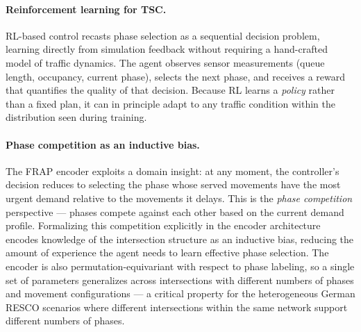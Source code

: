 \paragraph{Reinforcement learning for TSC.}
RL-based control recasts phase selection as a sequential decision problem, learning directly from simulation feedback without requiring a hand-crafted model of traffic dynamics. The agent observes sensor measurements (queue length, occupancy, current phase), selects the next phase, and receives a reward that quantifies the quality of that decision. Because RL learns a \emph{policy} rather than a fixed plan, it can in principle adapt to any traffic condition within the distribution seen during training.

\paragraph{Phase competition as an inductive bias.}
The FRAP encoder \citep{zheng2019learning} exploits a domain insight: at any moment, the controller's decision reduces to selecting the phase whose served movements have the most urgent demand relative to the movements it delays. This is the \emph{phase competition} perspective — phases compete against each other based on the current demand profile. Formalizing this competition explicitly in the encoder architecture encodes knowledge of the intersection structure as an inductive bias, reducing the amount of experience the agent needs to learn effective phase selection. The encoder is also permutation-equivariant with respect to phase labeling, so a single set of parameters generalizes across intersections with different numbers of phases and movement configurations — a critical property for the heterogeneous German RESCO scenarios where different intersections within the same network support different numbers of phases.
